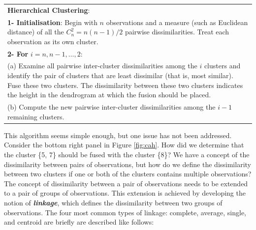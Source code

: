 \documentclass[]{book}
\theoremstyle{definition}
\theoremstyle{definition}
\theoremstyle{definition}
\theoremstyle{remark}
\begin{document}
\begin{longtable}[]{@{}l@{}}
\toprule
\begin{minipage}[t]{0.97\columnwidth}\raggedright\strut
\textbf{Hierarchical Clustering}:\strut
\end{minipage}\tabularnewline
\begin{minipage}[t]{0.97\columnwidth}\raggedright\strut
\textbf{1- Initialisation}: Begin with \(n\) observations and a measure
(such as Euclidean distance) of all the \(C^2_n = n(n−1)/2\) pairwise
dissimilarities. Treat each observation as its own cluster.\strut
\end{minipage}\tabularnewline
\begin{minipage}[t]{0.97\columnwidth}\raggedright\strut
\textbf{2- For} \(i=n,n-1,\ldots,2\):\strut
\end{minipage}\tabularnewline
\begin{minipage}[t]{0.97\columnwidth}\raggedright\strut
(a) Examine all pairwise inter-cluster dissimilarities among the \(i\)
clusters and identify the pair of clusters that are least dissimilar
(that is, most similar). Fuse these two clusters. The dissimilarity
between these two clusters indicates the height in the dendrogram at
which the fusion should be placed.\strut
\end{minipage}\tabularnewline
\begin{minipage}[t]{0.97\columnwidth}\raggedright\strut
(b) Compute the new pairwise inter-cluster dissimilarities among the
\(i − 1\) remaining clusters.\strut
\end{minipage}\tabularnewline
\bottomrule
\end{longtable}

This algorithm seems simple enough, but one issue has not been
addressed. Consider the bottom right panel in Figure \ref{fig:cah}. How
did we determine that the cluster \{5, 7\} should be fused with the
cluster \{8\}? We have a concept of the dissimilarity between pairs of
observations, but how do we define the dissimilarity between two
clusters if one or both of the clusters contains multiple observations?
The concept of dissimilarity between a pair of observations needs to be
extended to a pair of groups of observations. This extension is achieved
by developing the notion of \textbf{\emph{linkage}}, which defines the
dissimilarity between two groups of observations. The four most common
types of linkage: complete, average, single, and centroid are briefly
are described like follows:
\end{document}
